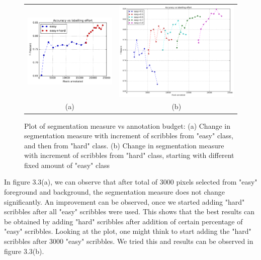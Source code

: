 \begin{figure}[h!] \label{fig:easy_hard1}
\begin{tabular}{cc}
 \includegraphics[width=0.45\linewidth]{figures/rf_easy_then_hard.pdf} & \includegraphics[width=0.55\linewidth]{figures/rf_easy_hard.pdf} \\
  (a)  & (b) \\
\end{tabular}
\caption{Plot of segmentation measure vs annotation budget: (a) Change in segmentation measure with increment of scribbles from "easy" class, and then from "hard" class. (b) Change in segmentation measure with increment of scribbles from "hard" class, starting with different fixed amount of "easy" class}
\end{figure}


In figure 3.3(a), we can observe that after total of 3000 pixels selected from "easy" foreground and background, the segmentation measure does not change significantly. An improvement can be observed, once we started adding "hard" scribbles after all "easy" scribbles were used. This shows that the best results can be obtained by adding "hard" scribbles after addition of certain percentage of "easy" scribbles. Looking at the plot, one might think to start adding the "hard" scribbles after 3000 "easy" scribbles. We tried this and results can be observed in figure 3.3(b). \par

